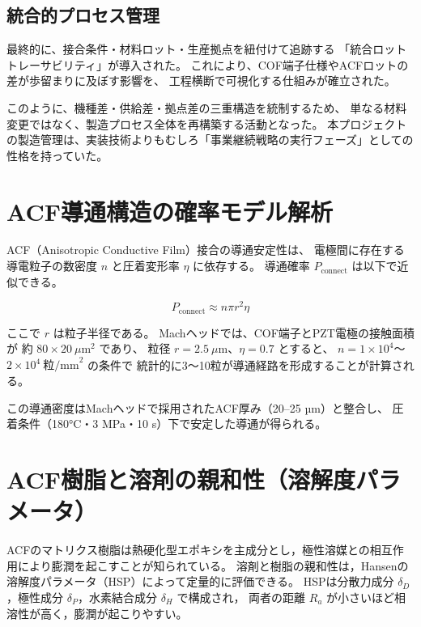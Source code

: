 \documentclass[conference]{IEEEtran}
\begin{document}
\subsection{統合的プロセス管理}
最終的に、接合条件・材料ロット・生産拠点を紐付けて追跡する  
「統合ロットトレーサビリティ」が導入された。  
これにより、COF端子仕様やACFロットの差が歩留まりに及ぼす影響を、  
工程横断で可視化する仕組みが確立された。  

このように、機種差・供給差・拠点差の三重構造を統制するため、  
単なる材料変更ではなく、製造プロセス全体を再構築する活動となった。  
本プロジェクトの製造管理は、実装技術よりもむしろ「事業継続戦略の実行フェーズ」としての性格を持っていた。

\section{ACF導通構造の確率モデル解析}

ACF（Anisotropic Conductive Film）接合の導通安定性は、
電極間に存在する導電粒子の数密度 $n$ と圧着変形率 $\eta$ に依存する。
導通確率 $P_{\text{connect}}$ は以下で近似できる。

\begin{equation}
P_{\text{connect}} \approx n \pi r^2 \eta
\end{equation}

ここで $r$ は粒子半径である。
Machヘッドでは、COF端子とPZT電極の接触面積が
約 $80 \times 20~\mu\text{m}^2$ であり、
粒径 $r = 2.5~\mu$m、$\eta = 0.7$ とすると、
$n = 1\times10^4$〜$2\times10^4~\text{粒/mm}^2$ の条件で
統計的に3〜10粒が導通経路を形成することが計算される。

この導通密度はMachヘッドで採用されたACF厚み（20–25 µm）と整合し、
圧着条件（180°C・3 MPa・10 s）下で安定した導通が得られる。

\section{ACF樹脂と溶剤の親和性（溶解度パラメータ）}

ACFのマトリクス樹脂は熱硬化型エポキシを主成分とし，極性溶媒との相互作用により膨潤を起こすことが知られている。
溶剤と樹脂の親和性は，Hansenの溶解度パラメータ（HSP）によって定量的に評価できる。
HSPは分散力成分 $\delta_D$，極性成分 $\delta_P$，水素結合成分 $\delta_H$ で構成され，
両者の距離 $R_a$ が小さいほど相溶性が高く，膨潤が起こりやすい。
\end{document}
